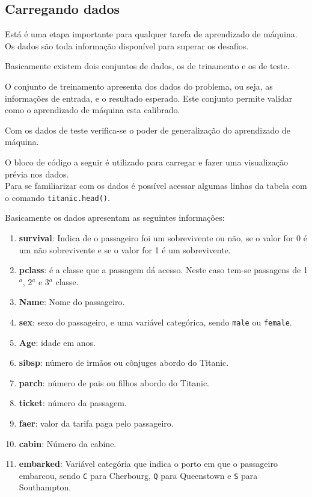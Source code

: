 \documentclass[a4paper,12pt]{report}
\begin{document}


\subsection{Carregando dados}

Está é uma etapa importante para qualquer tarefa de aprendizado de máquina. Os dados são toda informação disponível para superar os desafios. 

Basicamente existem dois conjuntos de dados, os de trinamento e os de teste. 

O conjunto de treinamento apresenta dos dados do problema, ou seja, as informações de entrada, e o resultado esperado. Este conjunto permite validar como o aprendizado de máquina esta calibrado. 

Com os dados de teste verifica-se o poder de generalização do aprendizado de máquina.

O bloco de código a seguir é utilizado para carregar e fazer uma visualização prévia nos dados.\\



Para se familiarizar com os dados é possível acessar algumas linhas da tabela com o comando \texttt{titanic.head()}.

Basicamente os dados apresentam as seguintes informações:

\begin{enumerate}
	\item \textbf{survival}: Indica de o passageiro foi um sobrevivente ou não, se o valor for 0 é um não sobrevivente e se o valor for 1 é um sobrevivente.
	\item \textbf{pclass}: é a classe que a passagem dá acesso. Neste caso tem-se passagens de 1$^a$, 2$^a$ e 3$^a$ classe.
	\item \textbf{Name}: Nome do passageiro.
	\item \textbf{sex}: sexo do passageiro, e uma variável categórica, sendo \texttt{male} ou \texttt{female}.
	\item \textbf{Age}: idade em anos.
	\item \textbf{sibsp}: número de irmãos ou cônjuges abordo do Titanic.
	\item \textbf{parch}: número de pais ou filhos abordo do Titanic.
	\item \textbf{ticket}: número da passagem.		
	\item \textbf{faer}: valor da tarifa paga pelo passageiro.
	\item \textbf{cabin}: Número da cabine.
	\item \textbf{embarked}: Variável categória que indica o porto em que o passageiro embarcou, sendo \texttt{C} para Cherbourg, \texttt{Q} para Queenstown e \texttt{S} para Southampton.
\end{enumerate}
\end{document}
